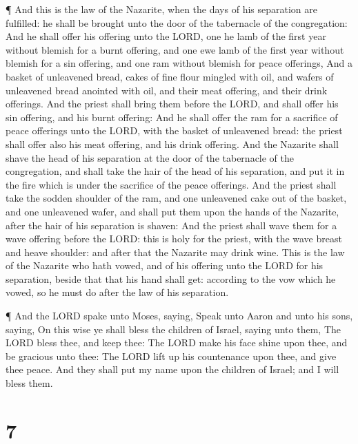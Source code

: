  ¶ And this is the law of the Nazarite, when the days of
his separation are fulfilled: he shall be brought unto the door of the
tabernacle of the congregation:  And he shall offer his
offering unto the LORD, one he lamb of the first year without blemish
for a burnt offering, and one ewe lamb of the first year without blemish
for a sin offering, and one ram without blemish for peace offerings,
 And a basket of unleavened bread, cakes of fine flour
mingled with oil, and wafers of unleavened bread anointed with oil, and
their meat offering, and their drink offerings.  And the
priest shall bring them before the LORD, and shall offer his sin
offering, and his burnt offering:  And he shall offer the
ram for a sacrifice of peace offerings unto the LORD, with the basket of
unleavened bread: the priest shall offer also his meat offering, and his
drink offering.  And the Nazarite shall shave the head of
his separation at the door of the tabernacle of the congregation, and
shall take the hair of the head of his separation, and put it in the
fire which is under the sacrifice of the peace offerings. 
And the priest shall take the sodden shoulder of the ram, and one
unleavened cake out of the basket, and one unleavened wafer, and shall
put them upon the hands of the Nazarite, after the hair of his
separation is shaven:  And the priest shall wave them for a
wave offering before the LORD: this is holy for the priest, with the
wave breast and heave shoulder: and after that the Nazarite may drink
wine.  This is the law of the Nazarite who hath vowed, and
of his offering unto the LORD for his separation, beside that that his
hand shall get: according to the vow which he vowed, so he must do after
the law of his separation.

 ¶ And the LORD spake unto Moses, saying, 
Speak unto Aaron and unto his sons, saying, On this wise ye shall bless
the children of Israel, saying unto them,  The LORD bless
thee, and keep thee:  The LORD make his face shine upon
thee, and be gracious unto thee:  The LORD lift up his
countenance upon thee, and give thee peace.  And they shall
put my name upon the children of Israel; and I will bless them.

\hypertarget{section-6}{%
\section{7}\label{section-6}}

